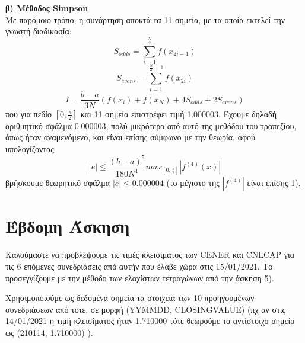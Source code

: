 \documentclass{article}
\newcommand{\lt}{\latintext}
\newcommand{\gt}{\greektext}
\begin{document}
\textbf{\gt β) Μέθοδος \lt Simpson}\\
\gt Με παρόμοιο τρόπο, η συνάρτηση αποκτά τα 11 σημεία, με τα οποία εκτελεί
\gt την γνωστή διαδικασία:
\begin{equation}
    S_{odds} = \sum_{i=1}^{\frac{N}{2}}f(x_{2i-1})
\end{equation}
\begin{equation}
    S_{evens} = \sum_{i=1}^{\frac{N}{2}-1}f(x_{2i})
\end{equation}
\begin{equation}
    I = \frac{b-a}{3N}(f(x_i) + f(x_N) + 4S_{odds} + 2S_{evens})
\end{equation}
\gt που για πεδίο $[0, \frac{\pi}{2}]$ και 11 σημεία επιστρέφει τιμή 1.000003.
\gt Έχουμε δηλαδή αριθμητικό σφάλμα 0.000003, πολύ μικρότερο από αυτό της μεθόδου
\gt του τραπεζίου, όπως ήταν αναμενόμενο, και είναι επίσης σύμφωνο με την θεωρία,
\gt αφού υπολογίζοντας
\begin{equation*}
    |e| \leq \frac{(b-a)^5}{180N^4}max_{[0, \frac{\pi}{2}]}|f^{(4)}(x)|
\end{equation*}
\gt βρήσκουμε θεωρητικό σφάλμα $|e| \leq 0.000004$ 
(το μέγιστο της $|f^{(4)}|$ είναι επίσης 1).

\section{\gt Έβδομη Άσκηση}
\gt Καλούμαστε να προβλέψουμε τις τιμές κλεισίματος των \lt CENER \gt και \lt CNLCAP
\gt για τις 6 επόμενες συνεδριάσεις από αυτήν που έλαβε χώρα στις 15/01/2021.
\gt Το προσεγγίζουμε με την μέθοδο των ελαχίστων τετραγώνων από την άσκηση 5).

\gt Χρησιμοποιούμε ως δεδομένα-σημεία τα στοιχεία των 10 προηγουμένων συνεδριάσεων από \gt τότε, σε μορφή \lt(YYMMDD, CLOSING\textunderscore VALUE)
(\gt πχ αν στις 14/01/2021 η τιμή κλεισίματος ήταν 1.710000 τότε θεωρούμε το αντίστοιχο
\gt σημείο ως (210114, 1.710000) ).
\end{document}
